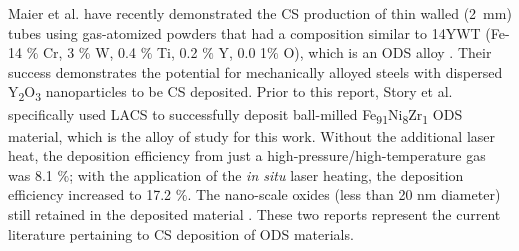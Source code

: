 	Maier et al. \cite{RN378} have recently demonstrated the CS production of thin walled (2 mm) tubes using gas-atomized powders that had a composition similar to 14YWT (Fe-14 $\%$ Cr, 3 $\%$ W, 0.4 $\%$ Ti, 0.2 $\%$ Y, 0.0 1$\%$ O), which is an ODS alloy \cite{RN378}. Their success demonstrates the potential for mechanically alloyed steels with dispersed Y\textsubscript{2}O\textsubscript{3 }nanoparticles to be CS deposited. Prior to this report, Story et al. \cite{RN383} specifically used LACS to successfully deposit ball-milled Fe\textsubscript{91}Ni\textsubscript{8}Zr\textsubscript{1}\textsubscript{ } ODS material, which is the alloy of study for this work. Without the additional laser heat, the deposition efficiency from just a high-pressure/high-temperature gas was 8.1 $\%$; with the application of the \textit{in situ} laser heating, the deposition efficiency increased to 17.2 $\%$. The nano-scale oxides (less than 20 nm diameter) still retained in the deposited material \cite{RN383}. These two reports represent the current literature pertaining to CS deposition of ODS materials.


